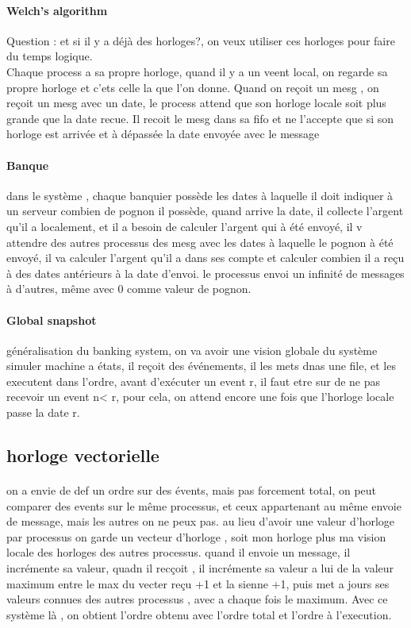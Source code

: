 \documentclass{article}
\begin{document}
\paragraph{Welch's algorithm} Question : et si il y a déjà des horloges?, on veux utiliser ces horloges pour faire du temps logique.\\Chaque process a sa propre horloge, quand il y a un veent local, on regarde sa propre horloge et c'ets celle la que l'on donne. Quand on reçoit un mesg , on reçoit un mesg avec un date, le process attend que son horloge locale soit plus grande que la date recue. Il recoit le mesg dans sa fifo et ne l'accepte que si son horloge est arrivée et à dépassée la date envoyée avec le message

\paragraph{Banque} dans le système , chaque banquier possède les dates à laquelle il doit indiquer à un serveur combien de pognon il possède, quand arrive la date, il collecte l'argent qu'il a localement, et il a  besoin de calculer l'argent qui à été envoyé, il v attendre des autres processus des mesg avec les dates à laquelle le pognon à été envoyé, il va calculer l'argent qu'il a dans ses compte et calculer combien il a reçu à des dates antérieurs à la date d'envoi. le processus envoi un infinité de messages à d'autres, même avec 0 comme valeur de pognon.

\paragraph{Global snapshot} généralisation du banking system, on va avoir une vision globale du système\\ simuler machine a états, il reçoit des événements, il les mets dnas une file, et les executent dans l'ordre, avant d'exécuter un event r, il faut etre sur de ne pas recevoir un event  n< r, pour cela, on attend encore une fois que l'horloge locale passe la date r.
\subsection{horloge vectorielle} 
\paragraph{} on a envie de def un ordre sur des évents, mais pas forcement total, on peut comparer des events sur le même processus, et ceux appartenant au même envoie de message, mais les autres on ne peux pas. au lieu d'avoir une valeur d'horloge par processus on garde un vecteur d'horloge , soit mon horloge plus ma vision locale des horloges des autres processus. quand il envoie un message, il incrémente sa valeur, quadn il recçoit , il incrémente sa valeur a lui de la valeur maximum entre le max du vecter reçu +1 et la sienne +1, puis met a jours ses valeurs connues des autres processus , avec a chaque fois le maximum. Avec ce système là , on obtient l'ordre obtenu avec l'ordre total et l'ordre à l'execution.
\end{document}
